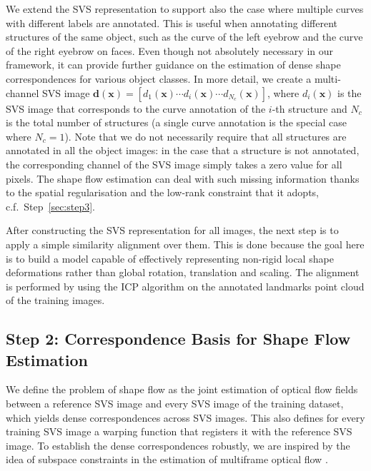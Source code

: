 
We extend the SVS representation to support also the case where multiple curves with different labels are annotated. This is useful when annotating different structures of the same object, such as the curve of the left eyebrow and the curve of the right eyebrow on faces. Even though not absolutely necessary in our framework, it can provide further guidance on the estimation of dense shape correspondences for various object classes. In more detail, we create a multi-channel SVS image $\bm{d}(\bm{x})=[d_1(\bm{x}) \cdots d_i(\bm{x}) \cdots d_{N_c}(\bm{x})]$, where $d_i(\bm{x})$ is the SVS image that corresponds to the curve annotation of the $i$-th structure and $N_c$ is the total number of structures (a single curve annotation is the special case where $N_c=1$). Note that we do not necessarily require that all structures are annotated in all the object images: in the case that a structure is not annotated, the corresponding channel of the SVS image simply takes a zero value for all pixels. The shape flow estimation can deal with such missing information thanks to the spatial regularisation and the low-rank constraint that it adopts, c.f.~Step~\ref{sec:step3}.

After constructing the SVS representation for all images, the next step is to apply a simple similarity alignment over them. This is done because the goal here is to build a model capable of effectively representing non-rigid local shape deformations rather than global rotation, translation and scaling. The alignment is performed by using the ICP algorithm \cite{Besl1992} on the annotated landmarks point cloud of the training images.


{\label{sec:step2}\subsection*{Step 2: Correspondence Basis for Shape Flow Estimation}}

We define the problem of shape flow as the joint estimation of optical flow fields between a reference SVS image and every SVS image of the training dataset, which yields dense correspondences across SVS images. This also defines for every training SVS image a warping function that registers it with the reference SVS image. To establish the dense correspondences robustly, we are inspired by the idea of subspace constraints in the estimation of multiframe optical flow \cite{Garg:2013hu}.

